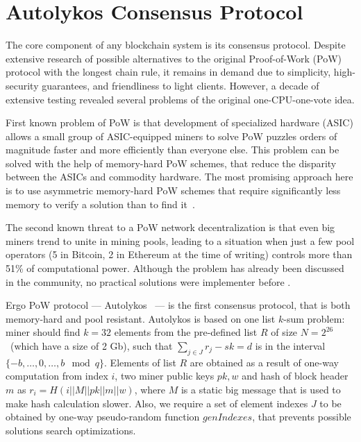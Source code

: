\section{Autolykos Consensus Protocol}
\label{sec:autolykos}


The core component of any blockchain system is its consensus protocol.
Despite extensive research of possible alternatives to the original Proof-of-Work (PoW) protocol
with the longest chain rule,
it remains in demand due to simplicity, high-security guarantees, and friendliness to light clients.
However, a decade of extensive testing revealed several problems of the original one-CPU-one-vote idea.

First known problem of PoW is that development of specialized hardware (ASIC) allows
a small group of ASIC-equipped miners to solve PoW puzzles orders of magnitude faster and more efficiently
than everyone else. This problem can be solved with the help of memory-hard PoW schemes,
that reduce the disparity between the ASICs and commodity hardware. The most promising approach here
is to use asymmetric memory-hard PoW schemes that require significantly less memory
to verify a solution than to find it~\cite{biryukov2017equihash,ethHash}.

The second known threat to a PoW network decentralization is that even big miners trend to unite in
mining pools, leading to a situation when just a few pool operators (5 in Bitcoin, 2 in Ethereum
at the time of writing) controls more than 51\% of computational power.
Although the problem has already been discussed in the community, no practical solutions were
implementer before \Ergo{}.


Ergo PoW protocol --- Autolykos~\cite{Ergopow} --- is the first consensus protocol, that is both memory-hard
and pool resistant.
Autolykos is based on one list $k$-sum problem: miner should find
$k=32$ elements from the pre-defined list $R$ of size $N=2^{26}$~(which have a size of 2 Gb),
such that $\sum_{j \in J} r_{j} - sk = d$ is in the interval $\{-b,\dots,0,\dots,b\mod q\}$.
Elements of list $R$ are obtained as a result of one-way computation from index $i$,
two miner public keys $pk,w$ and hash of block header $m$ as $r_i=H(i||M||pk||m||w)$,
where $M$ is a static big message that is used to make hash calculation slower.
Also, we require a set of element indexes $J$ to be obtained
by one-way pseudo-random function $genIndexes$, that prevents possible solutions
search optimizations.

